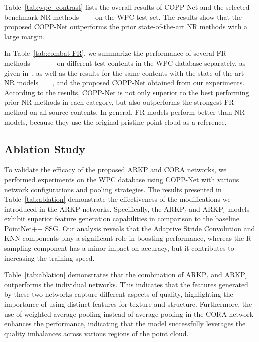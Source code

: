 \documentclass[conference]{IEEEtran}
\begin{document}
Table~\ref{tab:wpc_contrast} lists the overall results of COPP-Net and the selected benchmark NR methods~\cite{liu2021pqa}~\cite{zhang2022no}~\cite{liu2022point}~\cite{yang2022no} on the WPC test set. The results show that the proposed COPP-Net outperforms the prior state-of-the-art NR methods with a large margin. 

In Table~\ref{tab:combat FR}, we summarize the performance of several FR methods~\cite{mekuria2016evaluation}~\cite{mekuria2017performance}~\cite{meynet2020pcqm}~\cite{wang2004image}~\cite{yang2020inferring}~\cite{sheikh2006image}~\cite{liu2022perceptual} on different test contents in the WPC database separately, as given in~\cite{liu2022perceptual}, as well as the results for the same contents with the state-of-the-art NR models~\cite{liu2021pqa}~\cite{zhang2022no}~\cite{liu2022point}~\cite{yang2022no}, and the proposed COPP-Net obtained from our experiments. According to the results, COPP-Net is not only superior to the best performing prior NR methods in each category, but also outperforms the strongest FR method on all source contents. In general, FR models perform better than NR models, because they use the original pristine point cloud as a reference.



\subsection{Ablation Study}
To validate the efficacy of the proposed ARKP and CORA networks, we performed experiments on the WPC database using COPP-Net with various network configurations and pooling strategies. The results presented in Table~\ref{tab:ablation} demonstrate the effectiveness of the modifications we introduced in the ARKP networks. Specifically, the ARKP$_t$ and ARKP$_s$ models exhibit superior feature generation capabilities in comparison to the baseline PointNet++ SSG. Our analysis reveals that the Adaptive Stride Convolution and KNN components play a significant role in boosting performance, whereas the R-sampling component has a minor impact on accuracy, but it contributes to increasing the training speed.

Table~\ref{tab:ablation} demonstrates that the combination of ARKP$_t$ and ARKP$_s$ outperforms the individual networks. This indicates that the features generated by these two networks capture different aspects of quality, highlighting the importance of using distinct features for texture and structure. Furthermore, the use of weighted average pooling instead of average pooling in the CORA network enhances the performance, indicating that the model successfully leverages the quality imbalances across various regions of the point cloud.
\end{document}
